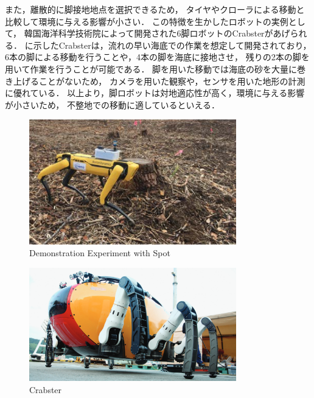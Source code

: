 また，離散的に脚接地地点を選択できるため，
タイヤやクローラによる移動と比較して環境に与える影響が小さい．
この特徴を生かしたロボットの実例として，
韓国海洋科学技術院によって開発された6脚ロボットのCrabster\cite{J_Kim_Dexterous_Crabster}があげられる．
に示したCrabsterは，流れの早い海底での作業を想定して開発されており，
6本の脚による移動を行うことや，4本の脚を海底に接地させ，
残りの2本の脚を用いて作業を行うことが可能である．
脚を用いた移動では海底の砂を大量に巻き上げることがないため\cite{J_Kim_Little_Crabster}，
カメラを用いた観察や，センサを用いた地形の計測に優れている．
以上より，脚ロボットは対地適応性が高く，環境に与える影響が小さいため，
不整地での移動に適しているといえる．

\begin{figure}[htbp]
  \begin{center}
    \includegraphics[width=90mm, clip]{figure/chapter1/NEDO.png}
    \caption{Demonstration Experiment with Spot}
    \label{fig:nedo_spot} %
  \end{center}
\end{figure}

\begin{figure}[htbp]
  \begin{center}
    \includegraphics[width=90mm, clip]{figure/chapter1/crabster.png}
    \caption{Crabster}
    \label{fig:crabster} %
  \end{center}
\end{figure}

